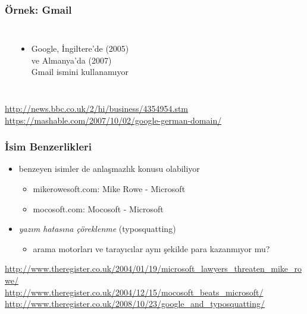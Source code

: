\documentclass[dvipsnames]{beamer}
\theoremstyle{definition}
\theoremstyle{example}
\theoremstyle{plain}
\begin{document}
\begin{frame}
  \frametitle{Örnek: Gmail}

  \begin{columns}
    \begin{center}
    \end{center}

    \begin{itemize}
      \item Google, İngiltere'de (2005)\\
        ve Almanya'da (2007)\\
        Gmail ismini kullanamıyor
    \end{itemize}
  \end{columns}

  \medskip
  \tiny{\url{http://news.bbc.co.uk/2/hi/business/4354954.stm}}\\
  \tiny{\url{https://mashable.com/2007/10/02/google-german-domain/}}\\
\end{frame}

\begin{frame}
  \frametitle{İsim Benzerlikleri}

  \begin{itemize}
    \item benzeyen isimler de anlaşmazlık konusu olabiliyor
    \begin{itemize}
      \item mikerowesoft.com: Mike Rowe - Microsoft
      \item mocosoft.com: Mocosoft - Microsoft
    \end{itemize}

    \medskip
    \item \emph{yazım hatasına çöreklenme} (typosquatting)
    \begin{itemize}
      \item arama motorları ve tarayıcılar aynı şekilde para kazanmıyor mu?
    \end{itemize}
  \end{itemize}

  \medskip
  \tiny{\url{http://www.theregister.co.uk/2004/01/19/microsoft_lawyers_threaten_mike_rowe/}}\\
  \tiny{\url{http://www.theregister.co.uk/2004/12/15/mocosoft_beats_microsoft/}}\\
  \tiny{\url{http://www.theregister.co.uk/2008/10/23/google_and_typosquatting/}}\\
\end{frame}
\end{document}
